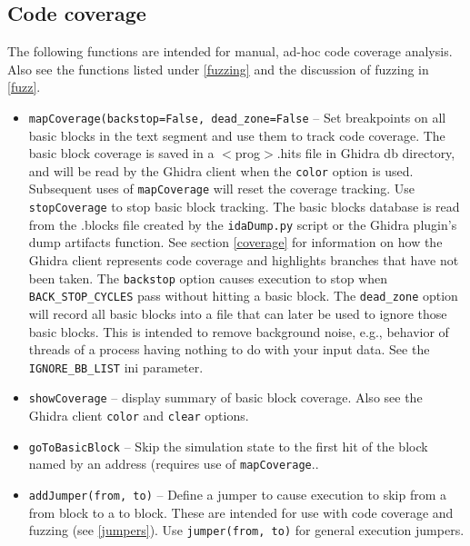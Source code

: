 \documentclass[titlepage]{article}
\begin{document}
\subsection{Code coverage}
\label{code-coverage}
The following functions are intended for manual, ad-hoc code coverage analysis.  Also see the functions listed under \ref{fuzzing} and the discussion
of fuzzing in \ref{fuzz}.
\begin{itemize}
\item {\tt mapCoverage(backstop=False, dead\_zone=False} -- Set breakpoints on all basic blocks in the text segment and use them to track code coverage. The basic block coverage is
saved in a $<$prog$>$.hits file in Ghidra db directory, and will be read by the Ghidra client when the {\tt color} option is used. Subsequent uses of {\tt mapCoverage}
will reset the coverage tracking.  Use {\tt stopCoverage} to stop basic block tracking.  The basic blocks database is read from the .blocks file created
by the {\tt idaDump.py} script or the Ghidra plugin's dump artifacts function.  See section \ref{coverage} for information on how the Ghidra client 
represents code coverage and highlights branches that have not been taken.  The {\tt backstop} option causes execution to stop when {\tt BACK\_STOP\_CYCLES} pass without
hitting a basic block.  The {\tt dead\_zone} option will record all basic blocks into a file that can later be used to ignore those basic blocks.  This is intended to
remove background noise, e.g., behavior of threads of a process having nothing to do with your input data.  See the {\tt IGNORE\_BB\_LIST} ini parameter.

\item {\tt showCoverage} -- display summary of basic block coverage.  Also see the Ghidra client {\tt color} and {\tt clear} options.

\item{\tt goToBasicBlock} -- Skip the simulation state to the first hit of the block named by an address (requires use of {\tt mapCoverage}..

\item{\tt addJumper(from, to)} -- Define a jumper to cause execution to skip from a from block to a to block.  These are intended for use with code coverage and fuzzing (see \ref{jumpers}).
Use {\tt jumper(from, to)} for general execution jumpers.
\end{itemize}
\end{document}
